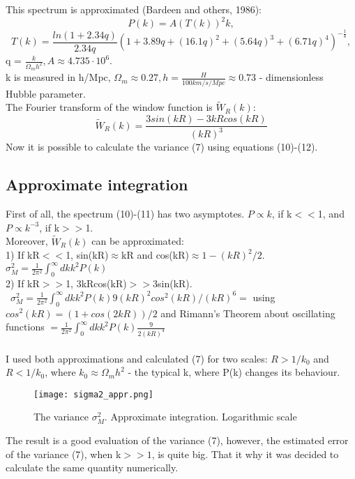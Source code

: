 \documentclass[11pt]{article}
\begin{document}
This spectrum is approximated (Bardeen and others, 1986): \\
\begin{equation}
P(k) = A(T(k))^2k,
\end{equation}
\begin{equation}
T(k) = \frac{ln(1+2.34q)}{2.34q}(1+3.89q+(16.1q)^2+(5.64q)^3+(6.71q)^4)^{-\frac{1}{4}},
\end{equation}
q = $\frac{k}{\Omega_mh^2}, A\approx4.735\cdot10^6.$ \\
k is measured in h/Mpc, $\Omega_m \approx0.27, h = \frac{H}{100km/s/Mpc}\approx0.73$ - dimensionless Hubble parameter.\\
The Fourier transform of the window function is $ \tilde{W}_R(k)$:
\begin{equation}
\tilde{W}_R(k) = \frac{3sin(kR) - 3kRcos(kR)}{(kR)^3}
\end{equation}
Now it is possible to calculate the variance (7) using equations (10)-(12).  
\subsection{Approximate integration}
First of all, the spectrum (10)-(11) has two asymptotes. $P\propto k$, if k$<<$1, and $P\propto k^{-3}$, if k$>>$1. \\
Moreover, $\tilde{W}_R(k)$ can be approximated:\\ 1) If kR$<<$1, sin(kR)$\approx$kR and cos(kR)$\approx 1-(kR)^2/2$. \\
$\sigma_{M}^{2} = \frac{1}{2\pi^2} \int_{0}^{\infty} dkk^2P(k)$\\
2) If kR$>>$1, 3kRcos(kR)$>>$3sin(kR). \\ \  $\sigma_{M}^{2} = \frac{1}{2\pi^2} \int_{0}^{\infty} dkk^2P(k)9(kR)^2cos^2(kR)/(kR)^6 = $ using $cos^2(kR) = (1+cos(2kR))/2$ and Rimann's Theorem about oscillating functions $ = \frac{1}{2\pi^2} \int_{0}^{\infty} dkk^2P(k)\frac{9}{2(kR)^4}$\\
\\
I used both approximations and calculated (7) for two scales: $R>1/k_0$ and $R<1/k_0$, where $k_0\approx \Omega_m h^2$ - the typical k, where P(k) changes its behaviour.\\
\begin{figure}[H]
\centering
\texttt{[image: sigma2\_appr.png]}
\caption{The variance $\sigma_{M}^{2}$. Approximate integration. Logarithmic scale}  
\end{figure}
The result is a good evaluation of the variance (7), however, the estimated error of the variance (7), when k$>>1$, is quite big. That it why it was decided to calculate the same quantity numerically. 
\end{document}
